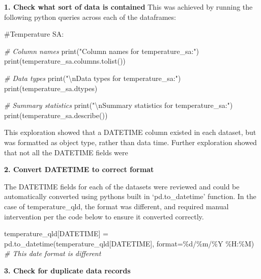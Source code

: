 \documentclass[
]{article}
\newenvironment{Shaded}{}{}
\newcommand{\BuiltInTok}[1]{\textcolor[rgb]{0.00,0.50,0.00}{#1}}
\newcommand{\CharTok}[1]{\textcolor[rgb]{0.25,0.44,0.63}{#1}}
\newcommand{\CommentTok}[1]{\textcolor[rgb]{0.38,0.63,0.69}{\textit{#1}}}
\newcommand{\NormalTok}[1]{#1}
\newcommand{\OperatorTok}[1]{\textcolor[rgb]{0.40,0.40,0.40}{#1}}
\newcommand{\SpecialCharTok}[1]{\textcolor[rgb]{0.25,0.44,0.63}{#1}}
\newcommand{\StringTok}[1]{\textcolor[rgb]{0.25,0.44,0.63}{#1}}
\begin{document}
\textbf{1. Check what sort of data is contained} This was achieved by
running the following python queries across each of the dataframes:

\#Temperature SA:

\begin{Shaded}
\begin{Highlighting}[]
\CommentTok{\# Column names}
\BuiltInTok{print}\NormalTok{(}\StringTok{"Column names for temperature\_sa:"}\NormalTok{)}
\BuiltInTok{print}\NormalTok{(temperature\_sa.columns.tolist())}

\CommentTok{\# Data types}
\BuiltInTok{print}\NormalTok{(}\StringTok{"}\CharTok{\textbackslash{}n}\StringTok{Data types for temperature\_sa:"}\NormalTok{)}
\BuiltInTok{print}\NormalTok{(temperature\_sa.dtypes)}

\CommentTok{\# Summary statistics}
\BuiltInTok{print}\NormalTok{(}\StringTok{"}\CharTok{\textbackslash{}n}\StringTok{Summary statistics for temperature\_sa:"}\NormalTok{)}
\BuiltInTok{print}\NormalTok{(temperature\_sa.describe())}
\end{Highlighting}
\end{Shaded}

This exploration showed that a DATETIME column existed in each dataset,
but was formatted as object type, rather than data time. Further
exploration showed that not all the DATETIME fields were

\textbf{2. Convert DATETIME to correct format}

The DATETIME fields for each of the datasets were reviewed and could be
automatically converted using pythons built in `pd.to\_datetime'
function. In the case of temperature\_qld, the format was different, and
required manual intervention per the code below to ensure it converted
correctly.

\begin{Shaded}
\begin{Highlighting}[]
\NormalTok{temperature\_qld[}\StringTok{\textquotesingle{}DATETIME\textquotesingle{}}\NormalTok{] }\OperatorTok{=}\NormalTok{ pd.to\_datetime(temperature\_qld[}\StringTok{\textquotesingle{}DATETIME\textquotesingle{}}\NormalTok{], }\BuiltInTok{format}\OperatorTok{=}\StringTok{\textquotesingle{}}\SpecialCharTok{\%d}\StringTok{/\%m/\%Y \%H:\%M\textquotesingle{}}\NormalTok{) }\CommentTok{\# This date format is different}
\end{Highlighting}
\end{Shaded}

\textbf{3. Check for duplicate data records}
\end{document}
